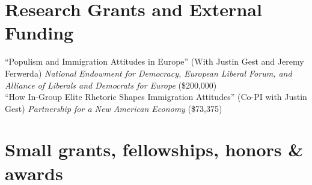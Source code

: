 \documentclass[11pt, a4paper]{article}
\newcommand{\years}[1]{\marginnote{\scriptsize #1}}
\begin{document}
\section*{Research Grants and External Funding}

\years{2018}``Populism and Immigration Attitudes in Europe'' (With Justin Gest and Jeremy Ferwerda) \textit{National Endowment for Democracy, European Liberal Forum, and Alliance of Liberals and Democrats for Europe} (\$200,000)\\
\years{2018}``How In-Group Elite Rhetoric Shapes Immigration Attitudes'' (Co-PI with Justin Gest) \textit{Partnership for a New American Economy} (\$73,375)\\

\section*{Small grants, fellowships, honors \& awards}
\end{document}
